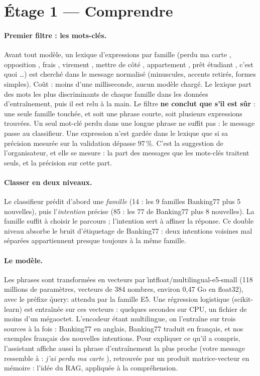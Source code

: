 \section{Étage 1 --- Comprendre}
\label{sec:nlu}

\paragraph{Premier filtre : les mots-clés.} Avant tout modèle, un lexique d'expressions par famille
(\og perdu ma carte \fg, \og opposition \fg, \og frais \fg, \og virement \fg, \og mettre de côté \fg,
\og appartement \fg, \og prêt étudiant \fg, \og c'est quoi \fg\dots) est cherché dans le message
normalisé (minuscules, accents retirés, formes simples). Coût : moins d'une milliseconde, aucun
modèle chargé. Le lexique part des mots les plus discriminants de chaque famille dans les données
d'entraînement, puis il est relu à la main. Le filtre \textbf{ne conclut que s'il est sûr} : une
seule famille touchée, et soit une phrase courte, soit plusieurs expressions trouvées. Un seul
mot-clé perdu dans une longue phrase ne suffit pas : le message passe au classifieur. Une
expression n'est gardée dans le lexique que si sa précision mesurée sur la validation dépasse
97\,\%. C'est la suggestion de l'organisateur, et elle se mesure : la part des messages que les
mots-clés traitent seuls, et la précision sur cette part.

\paragraph{Classer en deux niveaux.} Le classifieur prédit d'abord une \emph{famille} (14 : les 9
familles Banking77 plus 5 nouvelles), puis l'\emph{intention} précise (85 : les 77 de Banking77
plus 8 nouvelles). La famille suffit à choisir le parcours ; l'intention sert à affiner la réponse.
Ce double niveau absorbe le bruit d'étiquetage de Banking77 : deux intentions voisines mal séparées
appartiennent presque toujours à la même famille.

\paragraph{Le modèle.} Les phrases sont transformées en vecteurs par
\f{intfloat/multilingual-e5-small} (118 millions de paramètres, vecteurs de 384 nombres, environ
0,47 Go en float32), avec le préfixe \f{query:} attendu par la famille E5. Une régression
logistique (scikit-learn) est entraînée sur ces vecteurs : quelques secondes sur CPU, un fichier de
moins d'un mégaoctet. L'encodeur étant multilingue, on l'entraîne sur trois sources à la fois :
Banking77 en anglais, Banking77 traduit en français, et nos exemples français des nouvelles
intentions. Pour expliquer ce qu'il a compris, l'assistant affiche aussi la phrase
d'entraînement la plus proche (\og votre message ressemble à : \emph{j'ai perdu ma carte} \fg),
retrouvée par un produit matrice-vecteur en mémoire : l'idée du RAG, appliquée à la compréhension.

